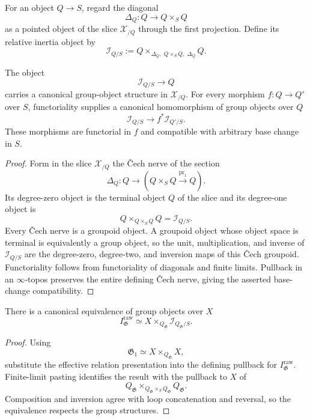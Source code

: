 \begin{definition}
\label{def:relative-inertia-object}
For an object $Q\to S$, regard the diagonal
\[
    \Delta_Q:Q\longrightarrow Q\times_SQ
\]
as a pointed object of the slice $\mathcal X_{/Q}$ through the first
projection.  Define its relative inertia object by
\[
    \mathcal I_{Q/S}
    :=
    Q\times_{\Delta_Q,\;Q\times_SQ,\;\Delta_Q}Q.
\]
\end{definition}

\begin{proposition}
\label{prop:relative-inertia-group}
The object
\[
    \mathcal I_{Q/S}\longrightarrow Q
\]
carries a canonical group-object structure in $\mathcal X_{/Q}$.  For every
morphism $f:Q\to Q'$ over $S$, functoriality supplies a canonical homomorphism
of group objects over $Q$
\[
    \mathcal I_{Q/S}
    \longrightarrow
    f^*\mathcal I_{Q'/S}.
\]
These morphisms are functorial in $f$ and compatible with arbitrary base
change in $S$.
\end{proposition}

\begin{proof}
Form in the slice $\mathcal X_{/Q}$ the \v{C}ech nerve of the section
\[
    \Delta_Q:
    Q\longrightarrow
    (Q\times_SQ\xrightarrow{\operatorname{pr}_1}Q).
\]
Its degree-zero object is the terminal object $Q$ of the slice and its
degree-one object is
\[
    Q\times_{Q\times_SQ}Q
    =
    \mathcal I_{Q/S}.
\]
Every \v{C}ech nerve is a groupoid object.  A groupoid object whose object
space is terminal is equivalently a group object, so the unit, multiplication,
and inverse of $\mathcal I_{Q/S}$ are the degree-zero, degree-two, and inversion
maps of this \v{C}ech groupoid.  Functoriality follows from functoriality of
diagonals and finite limits.  Pullback in an $\infty$-topos preserves the
entire defining \v{C}ech nerve, giving the asserted base-change compatibility.
\end{proof}

\begin{proposition}
\label{prop:isotropy-inertia}
There is a canonical equivalence of group objects over $X$
\[
    I^{\mathrm{raw}}_{\mathfrak G}
    \simeq
    X\times_{Q_{\mathfrak G}}
    \mathcal I_{Q_{\mathfrak G}/S}.
\]
\end{proposition}

\begin{proof}
Using
\[
    \mathfrak G_1
    \simeq
    X\times_{Q_{\mathfrak G}}X,
\]
substitute the effective relation presentation into the defining pullback for
$I^{\mathrm{raw}}_{\mathfrak G}$.  Finite-limit pasting identifies the
result with the pullback to $X$ of
\[
    Q_{\mathfrak G}
    \times_{Q_{\mathfrak G}\times_SQ_{\mathfrak G}}
    Q_{\mathfrak G}.
\]
Composition and inversion agree with loop concatenation and reversal, so the
equivalence respects the group structures.
\end{proof}

